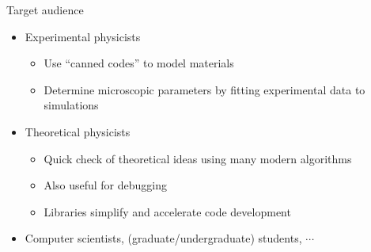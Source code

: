 \begin{frame}[t,fragile]{Target audience}
  \begin{itemize}
    \setlength{\itemsep}{1em}
  \item Experimental physicists
    \begin{itemize}
    \item Use ``canned codes'' to model materials
    \item Determine microscopic parameters by fitting experimental data to simulations
    \end{itemize}
  \item Theoretical physicists
    \begin{itemize}
    \item Quick check of theoretical ideas using many modern algorithms
    \item Also useful for debugging
    \item Libraries simplify and accelerate code development
    \end{itemize}
  \item Computer scientists, (graduate/undergraduate) students, $\cdots$
  \end{itemize}
\end{frame}


